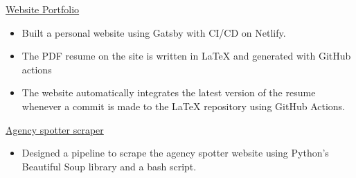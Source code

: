 
\href{https://rsun.dev}{Website Portfolio}
\begin{itemize}
    \item Built a personal website using Gatsby with CI/CD on Netlify.
    \item The PDF resume on the site is written in \LaTeX{} and generated with GitHub actions
    \item The website automatically integrates the latest version of the resume whenever a commit is made to the \LaTeX{} repository using GitHub Actions.
\end{itemize}


\href{https://github.com/rahul-sundaresan/agency-spotter-scraper}{Agency spotter scraper}
\begin{itemize}
    \item Designed a pipeline to scrape the agency spotter website using Python's Beautiful Soup library and a bash script.
\end{itemize}

